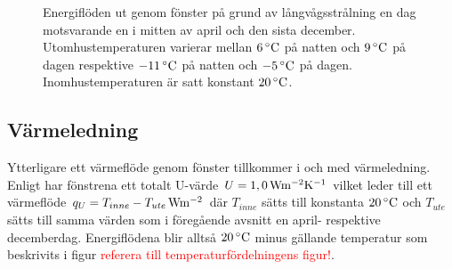 \begin{figure}[hpbt]
\centering

\vspace{1cm}

\caption{\label{fig:IRwindows} Energiflöden ut genom fönster på grund av långvågsstrålning en dag motsvarande en i mitten av april och den sista december.
Utomhustemperaturen varierar mellan $\unit[6]{^\circ C}$ på natten och $\unit[9]{^\circ C}$ på dagen respektive $\unit[-11]{^\circ C}$ på natten och $\unit[-5]{^\circ C}$ på dagen. Inomhustemperaturen är satt konstant $\unit[20]{^\circ C}$.}
\end{figure}


\subsection{Värmeledning}

Ytterligare ett värmeflöde genom fönster tillkommer i och med värmeledning. Enligt \cite{petersarneo} har fönstrena ett totalt U-värde $U=\unit[1,0]{Wm^{-2}K^{-1}}$ vilket leder till ett värmeflöde $q_{U}=\unit[T_{inne}-T_{ute}]{Wm^{-2}}$ där $T_{inne}$ sätts till konstanta $\unit[20]{^{\circ}C}$ och $T_{ute}$ sätts till samma värden som i föregående avsnitt en april- respektive decemberdag. Energiflödena blir alltså $\unit[20]{^{\circ}C}$ minus gällande temperatur som beskrivits i figur \textcolor{red}{referera till temperaturfördelningens figur!}.
